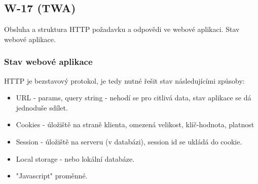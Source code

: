 \subsection{W-17 (TWA)}
Obsluha a struktura HTTP požadavku a odpovědi ve webové aplikaci. Stav webové aplikace.

\subsubsection*{Stav webové aplikace}

HTTP je bezstavový protokol, je tedy nutné řešit stav následujícími způsoby:

\begin{itemize}
  \item URL - params, query string - nehodí se pro citlivá data, stav aplikace se dá jednoduše sdílet.
  \item Cookies - úložiště na straně klienta, omezená velikost, klíč-hodnota, platnost 
  \item Session - úložiště na serveru (v databázi), session id se ukládá do cookie.
  \item Local storage - nebo lokální databáze.
  \item "Javascript" proměnné.
\end{itemize}
